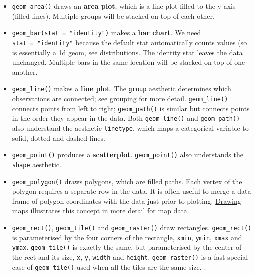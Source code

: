 \begin{itemize}
\item
  \texttt{geom\_area()} draws an \textbf{area plot}, which is a line
  plot filled to the y-axis (filled lines). Multiple groups will be
  stacked on top of each other.  
\item
  \texttt{geom\_bar(stat\ =\ "identity")} makes a \textbf{bar chart}. We
  need \texttt{stat\ =\ "identity"} because the default stat
  automatically counts values (so is essentially a 1d geom, see
  \protect\hyperlink{sec:distributions}{distributions}. The identity
  stat leaves the data unchanged. Multiple bars in the same location
  will be stacked on top of one another.
\item
  \texttt{geom\_line()} makes a \textbf{line plot}. The \texttt{group}
  aesthetic determines which observations are connected; see
  \protect\hyperlink{sec:grouping}{grouping} for more detail.
  \texttt{geom\_line()} connects points from left to right;
  \texttt{geom\_path()} is similar but connects points in the order they
  appear in the data. Both \texttt{geom\_line()} and
  \texttt{geom\_path()} also understand the aesthetic \texttt{linetype},
  which maps a categorical variable to solid, dotted and dashed lines.
    
\item
  \texttt{geom\_point()} produces a \textbf{scatterplot}.
  \texttt{geom\_point()} also understands the \texttt{shape} aesthetic.
\item
  \texttt{geom\_polygon()} draws polygons, which are filled paths. Each
  vertex of the polygon requires a separate row in the data. It is often
  useful to merge a data frame of polygon coordinates with the data just
  prior to plotting. \protect\hyperlink{sec:maps}{Drawing maps}
  illustrates this concept in more detail for map data.
\item
  \texttt{geom\_rect()}, \texttt{geom\_tile()} and
  \texttt{geom\_raster()} draw rectangles. \texttt{geom\_rect()} is
  parameterised by the four corners of the rectangle, \texttt{xmin},
  \texttt{ymin}, \texttt{xmax} and \texttt{ymax}. \texttt{geom\_tile()}
  is exactly the same, but parameterised by the center of the rect and
  its size, \texttt{x}, \texttt{y}, \texttt{width} and \texttt{height}.
  \texttt{geom\_raster()} is a fast special case of
  \texttt{geom\_tile()} used when all the tiles are the same size.
    .
   
\end{itemize}


